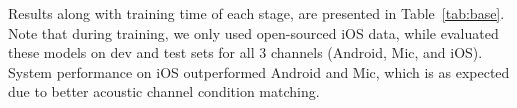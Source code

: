 \documentclass[a4paper]{article}
\begin{document}
Results along with training time of each stage, are presented in Table~\ref{tab:base}.
Note that during training, we only used open-sourced iOS data, while evaluated these models on dev and test sets for all 3 channels (Android, Mic, and iOS). System performance on iOS outperformed Android and Mic, which is as expected due to better acoustic channel condition matching.

%
%
%
%
\end{document}
